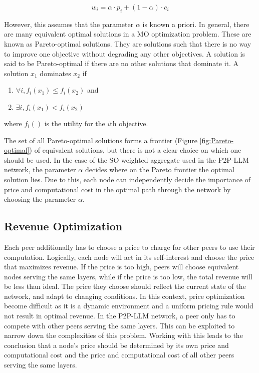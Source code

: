 \documentclass[preprint,twoside,11pt]{article}
\begin{document}
\begin{equation}
	w_i = \alpha \cdot p_i + (1 - \alpha) \cdot c_i
	\label{eq:weight}
\end{equation}

However, this assumes that the parameter $\alpha$ is known a priori. In general, there are many equivalent optimal solutions in a MO optimization problem.
These are known as Pareto-optimal solutions. They are solutions such that there is no way to improve one objective without degrading any other objectives.
A solution is said to be Pareto-optimal if there are no other solutions that dominate it. A solution $x_1$ dominates $x_2$ if
\begin{enumerate}
	\item $\forall i, f_i(x_1) \leq f_i(x_2)$ and
	\item $\exists i, f_i(x_1) < f_i(x_2)$
\end{enumerate}
where $f_i()$ is the utility for the $i$th objective.

The set of all Pareto-optimal solutions forms a frontier (Figure \ref{fig:Pareto-optimal}) of equivalent solutions, but there is not a clear choice on which one should be used.
In the case of the SO weighted aggregate used in the P2P-LLM network, the parameter $\alpha$ decides where on the Pareto frontier the optimal solution lies.
Due to this, each node can independently decide the importance of price and computational cost in the optimal path through the network by choosing the parameter $\alpha$.

\subsection{Revenue Optimization}

Each peer additionally has to choose a price to charge for other peers to use their computation.
Logically, each node will act in its self-interest and choose the price that maximizes revenue.
If the price is too high, peers will choose equivalent nodes serving the same layers,
while if the price is too low, the total revenue will be less than ideal.
The price they choose should reflect the current state of the network, and adapt to changing conditions.
In this context, price optimization become difficult as it is a dynamic environment
and a uniform pricing rule would not result in optimal revenue.
In the P2P-LLM network, a peer only has to compete with other peers serving the same layers.
This can be exploited to narrow down the complexities of this problem.
Working with this leads to the conclusion that a node's price should be determined
by its own price and computational cost and the price and computational cost of all other peers serving the same layers.
\end{document}
